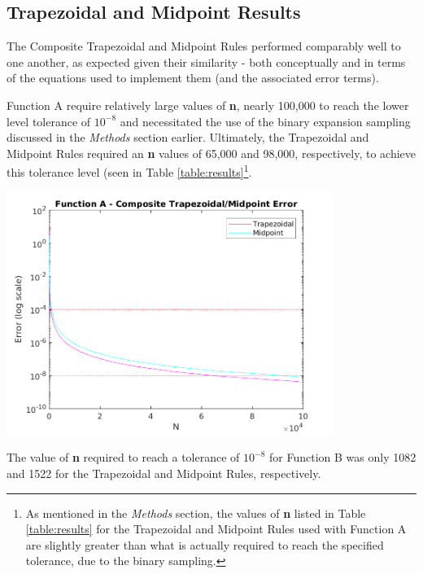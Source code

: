 \documentclass[a4paper]{article}
\begin{document}
\subsection{Trapezoidal and Midpoint Results}
\label{results:trapmid}

The Composite Trapezoidal and Midpoint Rules performed comparably well to one another, as expected given their similarity - both conceptually and in terms of the equations used to implement them (and the associated error terms).

Function A require relatively large values of \textbf{n}, nearly 100,000 to reach the lower level tolerance of $10^{-8}$ and necessitated the use of the binary expansion sampling discussed in the \textit{Methods} section earlier. Ultimately, the Trapezoidal and Midpoint Rules required an \textbf{n} values of 65,000 and 98,000, respectively, to achieve this tolerance level (seen in Table \ref{table:results}\footnote{As mentioned in the \textit{Methods} section, the values of \textbf{n} listed in Table \ref{table:results} for the Trapezoidal and Midpoint Rules used with Function A are slightly greater than what is actually required to reach the specified tolerance, due to the binary sampling.}.  

\begin{center}
	\includegraphics[width=0.8\textwidth]{../output/a_trapezoidal_midpoint.png}
	\label{fig:a_trap_mid}
\end{center}

The value of \textbf{n} required to reach a tolerance of $10^{-8}$ for Function B was only 1082 and 1522 for the Trapezoidal and Midpoint Rules, respectively.
\end{document}
